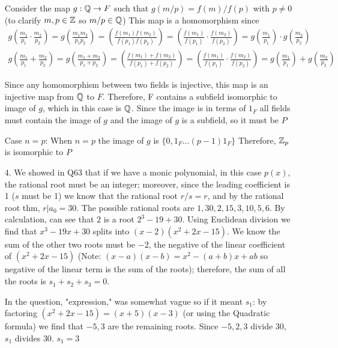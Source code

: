 \documentclass{article}
\begin{document}
\begin{enumerate}
    Consider the map \(g: \mathbb{Q} \to F\) such that \(g(m/p) = f(m)/f(p)\) with \(p \neq 0\) (to clarify \(m, p \in \mathbb{Z}\) so \(m/p \in \mathbb{Q}\)) This map is a homomorphism since 
    \begin{eqnarray*}
        g(\frac{m_1}{p_1} \cdot \frac{m_2}{p_2}) =
        g(\frac{m_1m_2}{p_1p_2}) =
        (\frac{f(m_1)f(m_2)}{f(p_1)f(p_2)}) =
        (\frac{f(m_1)}{f(p_1)} \cdot \frac{f(m_2)}{f(p_2)}) =
        g(\frac{m_1}{p_1}) \cdot g(\frac{m_2}{p_2})
    \end{eqnarray*}
    \begin{eqnarray*}
        g(\frac{m_1}{p_1} + \frac{m_2}{p_2}) =
        g(\frac{m_1 + m_2}{p_1 + p_2}) =
        (\frac{f(m_1) + f(m_2)}{f(p_1) + f(p_2)}) =
        (\frac{f(m_1)}{f(p_1)} \cdot \frac{f(m_2)}{f(p_2)}) =
        g(\frac{m_1}{p_1}) + g(\frac{m_2}{p_2})
    \end{eqnarray*}

    Since any homomorphism between two fields is injective, this map is an injective map from \(\mathbb{Q}\) to \(F\). Therefore, F contains a subfield isomorphic to image of \(g\), which in this case is \(\mathbb{Q}\). Since the image is in terms of \(1_F\) all fields must contain the image of \(g\) and the image of \(g\) is a subfield, so it must be \(P\)  

    Case \(n = p\):
    When \(n = p\) the image of \(g\) is \(\{0, 1_F \ldots (p-1)1_F \}\) Therefore, \(\mathbb{Z}_p\) is isomorphic to \(P\)    

    \item[4.] We showed in Q63 that if we have a monic polynomial, in this case \(p(x)\), the rational root must be an integer; moreover, since the leading coefficient is 1 (\(s\) must be 1) we know that the rational root \(r/s = r\), and by the rational root thm, \(r | a_0 = 30\). The possible rational roots are \(1,30,2,15,3,10,5,6\). By calculation, can see that \(2\) is a root \(2^3 - 19 + 30\). Using Euclidean division we find that \(x^3 - 19 x + 30\) splits into \((x-2)(x^2 + 2x - 15)\). We know the sum of the other two roots must be \(-2\), the negative of the linear coefficient of \((x^2 + 2x - 15)\) (Note: \((x-a)(x-b) = x^2 - (a+b)x  + ab\) so negative of the linear term is the sum of the roots); therefore, the sum of all the roots is \(s_1 + s_2 + s_3 = 0\).

    In the question, "expression," was somewhat vague so if it meant \(s_1\): by factoring \((x^2 + 2x - 15) = (x + 5)(x - 3)\) (or using the Quadratic formula) we find that \(-5, 3\) are the remaining roots. Since \(-5, 2, 3\) divide \(30\), \(s_1\) divides \(30\). \(s_1 = 3\)     
\end{enumerate}
\end{document}
